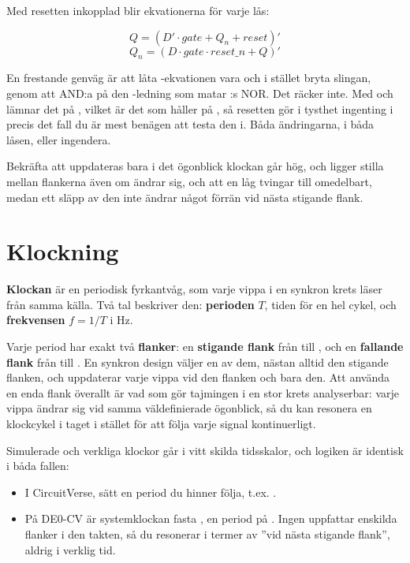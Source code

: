 Med resetten inkopplad blir ekvationerna för varje lås:

\[ Q = (D' \cdot \mathit{gate} + Q_n + \mathit{reset})' \]
\[ Q_n = (D \cdot \mathit{gate} \cdot \mathit{reset\_n} + Q)' \]

En frestande genväg är att låta -ekvationen vara och i stället bryta slingan, genom att
AND:a  på den -ledning som matar :s NOR. Det räcker inte. Med
 och  lämnar det  på , vilket är det som håller
 på , så resetten gör i tysthet ingenting i precis det fall du är mest benägen att
testa den i. Båda ändringarna, i båda låsen, eller ingendera.

Bekräfta att  uppdateras bara i det ögonblick klockan går hög, och ligger stilla mellan
flankerna även om  ändrar sig, och att en låg  tvingar  till 
omedelbart, medan ett släpp av den inte ändrar något förrän vid nästa stigande flank.

\section{Klockning}
\label{c3:sec:clock}

\textbf{Klockan} är en periodisk fyrkantvåg, som varje vippa i en synkron krets läser från samma
källa. Två tal beskriver den: \textbf{perioden} $T$, tiden för en hel cykel, och \textbf{frekvensen}
$f = 1/T$ i Hz.

Varje period har exakt två \textbf{flanker}: en \textbf{stigande flank} från  till
, och en \textbf{fallande flank} från  till . En synkron design väljer en
av dem, nästan alltid den stigande flanken, och uppdaterar varje vippa vid den flanken och bara
den. Att använda en enda flank överallt är vad som gör tajmingen i en stor krets analyserbar: varje
vippa ändrar sig vid samma väldefinierade ögonblick, så du kan resonera en klockcykel i taget i
stället för att följa varje signal kontinuerligt.

Simulerade och verkliga klockor går i vitt skilda tidsskalor, och logiken är identisk i båda
fallen:
\begin{itemize}
  \item I CircuitVerse, sätt en period du hinner följa, t.ex. .
  \item På DE0-CV är systemklockan fasta , en period på . Ingen uppfattar
    enskilda flanker i den takten, så du resonerar i termer av ”vid nästa stigande flank”, aldrig i
    verklig tid.
\end{itemize}

